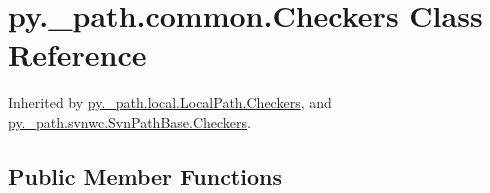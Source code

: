 \hypertarget{classpy_1_1__path_1_1common_1_1_checkers}{}\section{py.\+\_\+path.\+common.\+Checkers Class Reference}
\label{classpy_1_1__path_1_1common_1_1_checkers}


Inherited by \hyperlink{classpy_1_1__path_1_1local_1_1_local_path_1_1_checkers}{py.\+\_\+path.\+local.\+Local\+Path.\+Checkers}, and \hyperlink{classpy_1_1__path_1_1svnwc_1_1_svn_path_base_1_1_checkers}{py.\+\_\+path.\+svnwc.\+Svn\+Path\+Base.\+Checkers}.

\subsection*{Public Member Functions}
